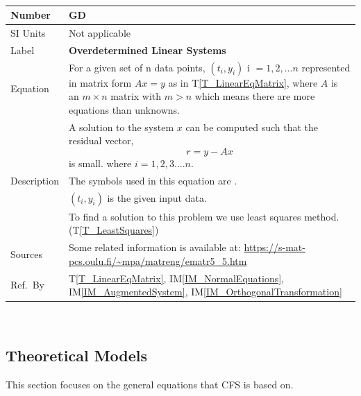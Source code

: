 \documentclass[12pt]{article}
\newcommand{\colAwidth}{0.13\textwidth}
\newcommand{\colBwidth}{0.82\textwidth}
\newcounter{defnum} %
\newcommand{\tref}[1]{T\ref{#1}}
\newcommand{\iref}[1]{IM\ref{#1}}
\newcommand{\famname}{CFS} %
\begin{document}
~\newline
\noindent
\begin{minipage}{\textwidth}
	\renewcommand*{\arraystretch}{1.5}
	\begin{tabular}{| p{\colAwidth} | p{\colBwidth}|}
		\hline
		\rowcolor[gray]{0.9}
		Number& GD{defnum}\thedefnum
		\label{GD_OverdetLinearSys}\\
		\hline
		SI Units& Not applicable\\
		\hline
		Label & \bf Overdetermined Linear Systems\\
		\hline
		Equation
		& For a given set of n data points, $(t_i,y_i)$ i $= {1,2,...n}$
                  represented in matrix form $Ax = y$ as in
                  \tref{T_LinearEqMatrix}, where $A$ is an $m \times n$ matrix with $m > n$ which means there are more equations than unknowns. \\		
		& A solution to the system $x$ can be computed such that the residual vector,
		\begin{equation*}
		r = y - Ax
		\end{equation*} is small. 
		where $i = 1,2,3 ....n$.\\
		\hline
		
		Description 
		& The symbols used in this equation are .\\
		& $(t_i,y_i)$ is the given input data.\\
		& To find a solution to this problem we use least squares method.(\tref{T_LeastSquares})\\
		\hline
		
		Sources& Some related information is available at:
		\url{https://s-mat-pcs.oulu.fi/~mpa/matreng/ematr5_5.htm}\\
		\hline
		Ref.\ By & \tref{T_LinearEqMatrix}, \iref{IM_NormalEquations}, \iref{IM_AugmentedSystem}, \iref{IM_OrthogonalTransformation}\\
		\hline
	\end{tabular}
\end{minipage}\\

\subsection{Theoretical Models} \label{sec_theoretical}

This section focuses on the general equations that \famname{} is based on.
~\newline
\end{document}
